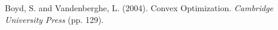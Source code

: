 \documentclass[spanish,a4paper,12pt,twoside]{report}
\begin{document}
  \chapter{\vspace{-3cm}{\LARGE 6. Solución propuesta}}
  
  \chapter{\vspace{-3cm}{\LARGE 7. Resultados}}
  
  \chapter{\vspace{-3cm}{\LARGE 8. Soluciones y líneas futuras}}
  
  \vspace{-1cm}
  \begin{thebibliography}{00}
     Boyd, S. and Vandenberghe, L. (2004). Convex Optimization. \emph{Cambridge University Press} (pp. 129).
  \end{thebibliography}
\end{document}
